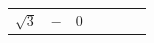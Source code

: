 {\begin{tabular}[t]{|l|l|l|l|l|l|l|}
                \begin{math}\sqrt{3}\end{math}
               &
                \begin{math}-\end{math}
               &
        0%
     \tabularnewline\cline{1-1}\cline{2-2}\cline{3-3}\cline{4-4}\cline{5-5}\cline{6-6}\cline{7-7}
    \end{tabular}} %
